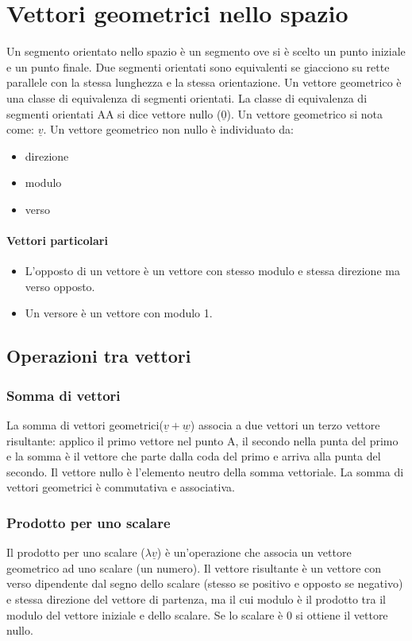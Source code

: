 \chapter{Vettori geometrici nello spazio}
Un segmento orientato nello spazio \`e un segmento ove si \`e scelto un punto iniziale e un punto finale. Due segmenti orientati sono equivalenti se giacciono su rette
parallele con la stessa lunghezza e la stessa orientazione. Un vettore geometrico \`e una classe di equivalenza di segmenti orientati. La classe di equivalenza di segmenti 
orientati AA si dice vettore nullo ($\underline{0}$). Un vettore geometrico si nota come: $\underline{v}$. Un vettore geometrico non nullo \`e individuato da:
\begin{itemize}
\item direzione
\item modulo 
\item verso
\end{itemize}
\subsubsection{Vettori particolari}
\begin{itemize}
\item L'opposto di un vettore \`e un vettore con stesso modulo e stessa direzione ma verso opposto. 
\item Un versore \`e un vettore con modulo 1.
\end{itemize}
\section{Operazioni tra vettori}
\subsection{Somma di vettori}
La somma di vettori geometrici($\underline{v}+\underline{w}$) associa a due vettori un terzo vettore risultante: applico il primo vettore nel punto A, il secondo nella punta 
del primo e la somma \`e il 
vettore che parte dalla coda del primo e arriva alla punta del secondo. Il vettore nullo \`e l'elemento neutro della somma vettoriale. La somma di vettori geometrici \`e 
commutativa e associativa.
\subsection{Prodotto per uno scalare}
Il prodotto per uno scalare ($\lambda\underline{v}$) \`e un'operazione che associa un vettore geometrico ad uno scalare (un numero). Il vettore risultante \`e un vettore con 
verso dipendente dal segno dello scalare (stesso se positivo e opposto se negativo) e stessa direzione del vettore di partenza, ma il cui modulo \`e il prodotto tra il modulo 
del vettore iniziale e dello scalare. Se lo scalare \`e 0 si ottiene il vettore nullo.
